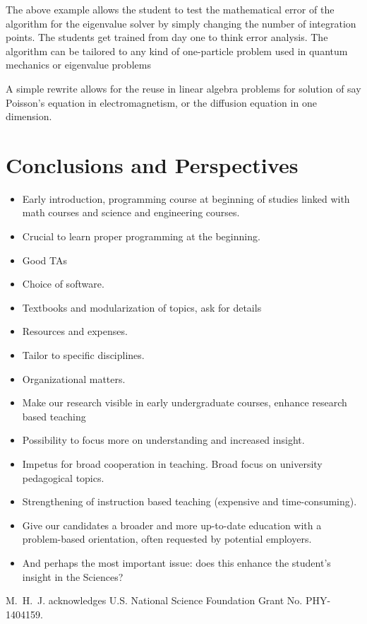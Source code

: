 \documentclass[graybox,envcountchap,sectrefs]{svmult}
\begin{document}
The above example allows the student to test the mathematical error of
the algorithm for the eigenvalue solver by simply changing the number
of integration points. The students get trained from day one to think
error analysis.  The algorithm can be tailored to any kind of
one-particle problem used in quantum mechanics or eigenvalue problems

A simple rewrite allows for the reuse in linear algebra problems for
solution of say Poisson's equation in electromagnetism, or the
diffusion equation in one dimension.


\section{Conclusions and Perspectives}


\begin{itemize}
\item Early introduction, programming course at beginning of studies linked with math courses and science and engineering courses.

\item Crucial to learn proper programming at the beginning.

\item Good TAs

\item Choice of software.

\item Textbooks and modularization of topics, ask for details

\item Resources and expenses.

\item Tailor to specific disciplines.

\item Organizational matters.


\item Make our research visible in early undergraduate courses, enhance research based teaching

\item Possibility to focus more on understanding and increased insight.

\item Impetus for broad cooperation in teaching. Broad focus on university pedagogical topics.

\item Strengthening of instruction based teaching (expensive and time-consuming).

\item Give our candidates a broader and more up-to-date education with a problem-based orientation, often requested by potential employers.

\item And perhaps the most important issue: does this enhance the student's insight in the Sciences?
\end{itemize}




\begin{acknowledgement}
M.~H.~J. acknowledges U.S. National Science Foundation  Grant No. PHY-1404159.
\end{acknowledgement}








\end{document}
